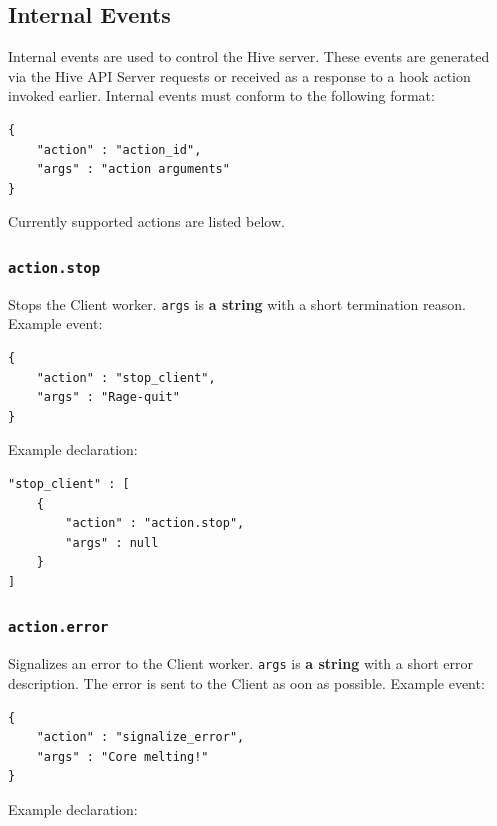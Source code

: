 \documentclass[a4paper]{article}
\begin{document}
\subsection{Internal Events}
\label{sec-8-3}
\label{ref-internal_events}
\label{ref-hive_events}


Internal events are used to control the Hive server. These events are generated via the Hive API Server requests or received as a response to a hook action invoked earlier. Internal events must conform to the following format:


\begin{verbatim}
{
    "action" : "action_id",
    "args" : "action arguments"
}
\end{verbatim}




\noindent
Currently supported actions are listed below.
\subsubsection{\texttt{action.stop}}
\label{sec-8-3-1}

Stops the Client worker. \texttt{args} is \textbf{a string} with a short termination reason. Example event:


\begin{verbatim}
{
    "action" : "stop_client",
    "args" : "Rage-quit"
}
\end{verbatim}




\noindent
Example declaration:

\begin{verbatim}
"stop_client" : [
    {
        "action" : "action.stop",
        "args" : null
    }
]
\end{verbatim}
\subsubsection{\texttt{action.error}}
\label{sec-8-3-2}

Signalizes an error to the Client worker. \texttt{args} is \textbf{a string} with a short error description. The error is sent to the Client as oon as possible. Example event:


\begin{verbatim}
{
    "action" : "signalize_error",
    "args" : "Core melting!"
}
\end{verbatim}




\noindent
Example declaration:
\end{document}
